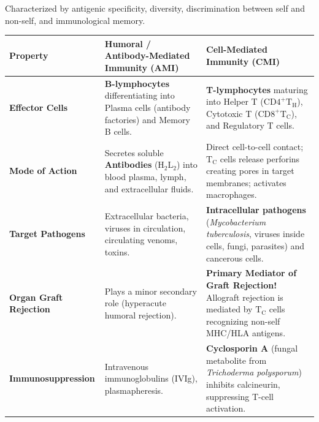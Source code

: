 \documentclass[10pt,a4paper]{article}
\begin{document}
\begin{conceptbox}
Characterized by antigenic specificity, diversity, discrimination between self and non-self, and immunological memory.
\begin{center}
\scriptsize
\begin{tabular}{|p{2.4cm}|p{6.2cm}|p{6.2cm}|}
\hline
\textbf{Property} & \textbf{Humoral / Antibody-Mediated Immunity (AMI)} & \textbf{Cell-Mediated Immunity (CMI)} \\
\hline
\textbf{Effector Cells} & \textbf{B-lymphocytes} differentiating into Plasma cells (antibody factories) and Memory B cells. & \textbf{T-lymphocytes} maturing into Helper T ($\mathrm{CD4}^+ \mathrm{T_H}$), Cytotoxic T ($\mathrm{CD8}^+ \mathrm{T_C}$), and Regulatory T cells. \\
\hline
\textbf{Mode of Action} & Secretes soluble \textbf{Antibodies} ($\mathrm{H_2L_2}$) into blood plasma, lymph, and extracellular fluids. & Direct cell-to-cell contact; $\mathrm{T_C}$ cells release perforins creating pores in target membranes; activates macrophages. \\
\hline
\textbf{Target Pathogens} & Extracellular bacteria, viruses in circulation, circulating venoms, toxins. & \textbf{Intracellular pathogens} (\textit{Mycobacterium tuberculosis}, viruses inside cells, fungi, parasites) and cancerous cells. \\
\hline
\textbf{Organ Graft Rejection} & Plays a minor secondary role (hyperacute humoral rejection). & \textbf{Primary Mediator of Graft Rejection!} Allograft rejection is mediated by $\mathrm{T_C}$ cells recognizing non-self MHC/HLA antigens. \\
\hline
\textbf{Immunosuppression} & Intravenous immunoglobulins (IVIg), plasmapheresis. & \textbf{Cyclosporin A} (fungal metabolite from \textit{Trichoderma polysporum}) inhibits calcineurin, suppressing T-cell activation. \\
\hline
\end{tabular}
\end{center}
\end{conceptbox}
\end{document}

